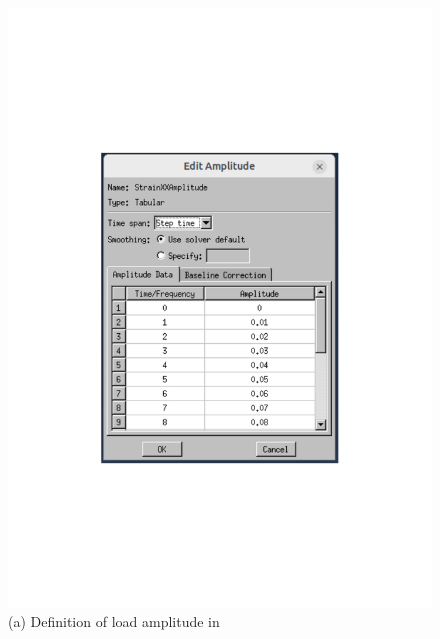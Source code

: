     \begin{figure}[H]
    \centering
    \begin{minipage}[T!]{1.0\textwidth}
        \centering
        \begin{minipage}[T!][9cm][T!]{0.35\textwidth}
            \includegraphics[width=1.0\textwidth]{Amplitude.pdf}
            \vfill{}
            \caption*{(a) Definition of load amplitude in }
            \label{fig:amplitudemenu}
        \end{minipage}
        \hspace{0.08\textwidth} %
        \begin{minipage}[T!][9cm][T!]{0.35\textwidth}

\end{minipage}
\end{minipage}
\end{figure}
